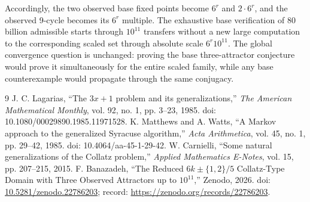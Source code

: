 \documentclass[11pt]{article}
\begin{document}
Accordingly, the two observed base fixed points become $6^r$ and $2\cdot6^r$, and the observed 9-cycle becomes its $6^r$ multiple. The exhaustive base verification of $80$ billion admissible starts through $10^{11}$ transfers without a new large computation to the corresponding scaled set through absolute scale $6^r10^{11}$. The global convergence question is unchanged: proving the base three-attractor conjecture would prove it simultaneously for the entire scaled family, while any base counterexample would propagate through the same conjugacy.

\begin{thebibliography}{9}
 J. C. Lagarias, ``The $3x+1$ problem and its generalizations,'' \emph{The American Mathematical Monthly}, vol. 92, no. 1, pp. 3--23, 1985. doi: 10.1080/00029890.1985.11971528.
 K. Matthews and A. Watts, ``A Markov approach to the generalized Syracuse algorithm,'' \emph{Acta Arithmetica}, vol. 45, no. 1, pp. 29--42, 1985. doi: 10.4064/aa-45-1-29-42.
 W. Carnielli, ``Some natural generalizations of the Collatz problem,'' \emph{Applied Mathematics E-Notes}, vol. 15, pp. 207--215, 2015.
 F. Banazadeh, ``The Reduced $6k\pm\{1,2\}/5$ Collatz-Type Domain with Three Observed Attractors up to $10^{11}$,'' Zenodo, 2026. doi: \href{https://doi.org/10.5281/zenodo.22786203}{10.5281/zenodo.22786203}; record: \url{https://zenodo.org/records/22786203}.
\end{thebibliography}
\end{document}
